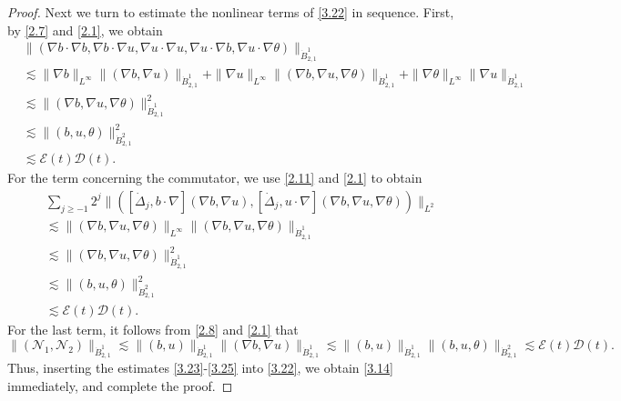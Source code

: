 \documentclass[reqno]{amsart}
\begin{document}
\begin{proof}
Next we turn to estimate the nonlinear terms of \eqref{3.22} in sequence. 
First, by \eqref{2.7} and \eqref{2.1}, we obtain
 \begin{equation}\label{3.23}
\begin{aligned}
&\|(\nabla b\cdot\nabla b,\nabla b\cdot\nabla u,\nabla u
 \cdot\nabla u,\nabla u\cdot\nabla b,\nabla u\cdot\nabla \theta)\|_{\dot{B}^1_{2,1}} \\
&\lesssim\|\nabla b\|_{L^\infty}\|(\nabla b,\nabla u)\|_{\dot{B}^1_{2,1}}
 +\|\nabla u\|_{L^\infty}\|(\nabla b,\nabla u,\nabla\theta)\|_{\dot{B}^1_{2,1}}
 +\|\nabla \theta\|_{L^\infty}\|\nabla u\|_{\dot{B}^1_{2,1}} \\
&\lesssim\|(\nabla b,\nabla u,\nabla\theta)\|_{\dot{B}^1_{2,1}}^2 \\
&\lesssim\|( b, u,\theta)\|_{\dot{B}^2_{2,1}}^2 \\
&\lesssim\mathcal{E}(t)\mathcal{D}(t).
\end{aligned}
\end{equation}
For the term concerning the commutator, we use \eqref{2.11} and \eqref{2.1} to obtain
\begin{equation}\label{3.24}
\begin{aligned}
&\sum_{j\geqslant-1}2^j\|([\dot{\Delta}_j,b\cdot\nabla](\nabla b,\nabla u),
 [\dot{\Delta}_j,u\cdot\nabla](\nabla b,\nabla u,\nabla\theta))\|_{L^2} \\
&\lesssim\|(\nabla b,\nabla u,\nabla\theta)\|_{L^\infty}\|(\nabla b,\nabla u,
 \nabla\theta)\|_{\dot{B}^1_{2,1}} \\
&\lesssim\|(\nabla b,\nabla u,\nabla\theta)\|_{\dot{B}^1_{2,1}}^2 \\
&\lesssim\|( b, u,\theta)\|_{\dot{B}^2_{2,1}}^2 \\
&\lesssim\mathcal{E}(t)\mathcal{D}(t).
\end{aligned}
\end{equation}
For the last term, it follows from \eqref{2.8} and \eqref{2.1} that
\begin{equation}\label{3.25}
 \|( \mathcal{N}_1, \mathcal{N}_2)\|_{\dot{B}^1_{2,1}}
 \lesssim \|( b, u)\|_{\dot{B}^1_{2,1}}\|(\nabla b,\nabla u)\|_{\dot{B}^1_{2,1}}
 \lesssim \|( b, u)\|_{\dot{B}^1_{2,1}}\|( b, u,\theta)\|_{\dot{B}^2_{2,1}} 
 \lesssim \mathcal{E}(t)\mathcal{D}(t).
\end{equation}
Thus, inserting the estimates \eqref{3.23}-\eqref{3.25} into \eqref{3.22}, 
we obtain \eqref{3.14} immediately, and complete the proof.
\end{proof}
\end{document}
